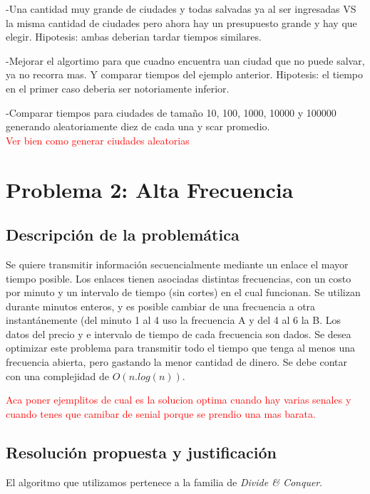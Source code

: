 \documentclass[a4paper]{article}
\begin{document}
-Una cantidad muy grande de ciudades y todas salvadas ya al ser ingresadas VS la misma cantidad de ciudades pero ahora hay un presupuesto grande y hay que elegir. Hipotesis: ambas deberian tardar tiempos similares.

-Mejorar el algortimo para que cuadno encuentra uan ciudad que no puede salvar, ya no recorra mas. Y comparar tiempos del ejemplo anterior. Hipotesis: el tiempo en el primer caso deberia ser notoriamente inferior.

-Comparar tiempos para ciudades de tama\~no 10, 100, 1000, 10000 y 100000 generando aleatoriamente diez de cada una y scar promedio.\\



\textcolor{red}{Ver bien como generar ciudades aleatorias}

\newpage

\section{Problema 2: Alta Frecuencia}
\subsection{Descripci\'on de la problem\'atica}

Se quiere transmitir informaci\'on secuencialmente mediante un enlace el mayor tiempo posible. Los enlaces tienen asociadas distintas frecuencias, con un costo por minuto y un intervalo de tiempo (sin cortes) en el cual funcionan. Se utilizan durante minutos enteros, y es posible cambiar de una frecuencia a otra instant\'anemente (del minuto 1 al 4 uso la frecuencia A y del 4 al 6 la B. Los datos del precio y e intervalo de tiempo de cada frecuencia son dados. Se desea optimizar este problema para transmitir todo el tiempo que tenga al menos una frecuencia abierta, pero gastando la menor cantidad de dinero. Se debe contar con una complejidad de $O(n.log(n))$.

\textcolor{red}{Aca poner ejemplitos de cual es la solucion optima cuando hay varias senales y cuando tenes que camibar de senial porque se prendio una mas barata.}

\subsection{Resoluci\'on propuesta y justificaci\'on}

El algoritmo que utilizamos pertenece a la familia de \emph{Divide \& Conquer}.\\
\end{document}

